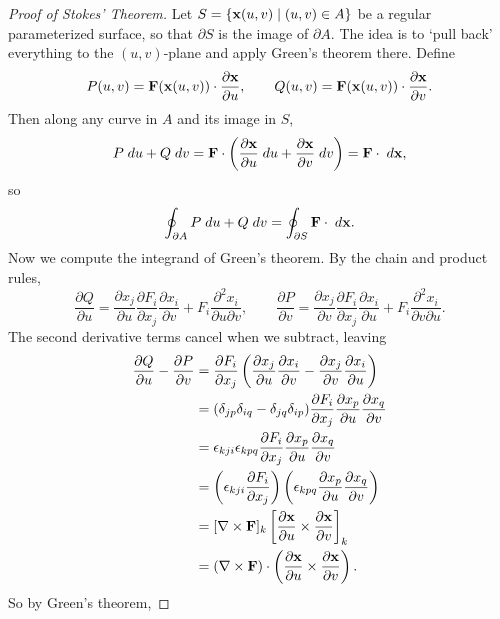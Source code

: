\documentclass[a4paper]{scrartcl}
\begin{document}
\begin{proof}[Proof of Stokes' Theorem]
	Let $S = \{\mathbf{x}(u, v) \mid (u, v) \in A\}$ be a regular parameterized surface, so that $\partial S$ is the image of $\partial A$. The idea is to `pull back' everything to the $(u, v)$-plane and apply Green's theorem there. Define
	$$
	P(u, v) = \mathbf{F}(\mathbf{x}(u, v)) \cdot \frac{\partial \mathbf{x}}{\partial u}, \quad \quad Q(u, v) = \mathbf{F}(\mathbf{x}(u, v)) \cdot \frac{\partial \mathbf{x}}{\partial v}.
	$$
	Then along any curve in $A$ and its image in $S$,
	$$
	P \; d u + Q \; d v = \mathbf{F} \cdot \left(\frac{\partial \mathbf{x}}{\partial u} \; d u + \frac{\partial \mathbf{x}}{\partial v} \; d v\right) = \mathbf{F} \cdot \; d \mathbf{x},
	$$
	so
	$$
	\oint_{\partial A} P \; d u + Q \; d v = \oint_{\partial S} \mathbf{F} \cdot \; d \mathbf{x}.
	$$
	Now we compute the integrand of Green's theorem. By the chain and product rules,
	$$
	\frac{\partial Q}{\partial u} = \frac{\partial x_j}{\partial u} \frac{\partial F_i}{\partial x_j} \frac{\partial x_i}{\partial v} + F_i \frac{\partial^2 x_i}{\partial u \partial v}, \quad \quad
	\frac{\partial P}{\partial v} = \frac{\partial x_j}{\partial v} \frac{\partial F_i}{\partial x_j} \frac{\partial x_i}{\partial u} + F_i \frac{\partial^2 x_i}{\partial v \partial u}.
	$$
	The second derivative terms cancel when we subtract, leaving
	\begin{align*}
		\frac{\partial Q}{\partial u} - \frac{\partial P}{\partial v} &= \frac{\partial F_i}{\partial x_j}\left(\frac{\partial x_j}{\partial u}\frac{\partial x_i}{\partial v} - \frac{\partial x_j}{\partial v} \frac{\partial x_i}{\partial u}\right) \\
		&= (\delta_{jp}\delta_{iq} - \delta_{jq}\delta_{ip}) \frac{\partial F_i}{\partial x_j} \frac{\partial x_p}{\partial u} \frac{\partial x_q}{\partial v} \\
		&= \epsilon_{kji}\epsilon_{kpq} \frac{\partial F_i}{\partial x_j} \frac{\partial x_p}{\partial u} \frac{\partial x_q}{\partial v} \\
		&= \left(\epsilon_{kji}\frac{\partial F_i}{\partial x_j}\right) \left(\epsilon_{kpq}\frac{\partial x_p}{\partial u} \frac{\partial x_q}{\partial v}\right) \\
		&= [\nabla \times \mathbf{F}]_k \left[\frac{\partial \mathbf{x}}{\partial u} \times \frac{\partial \mathbf{x}}{\partial v}\right]_k \\
		&= (\nabla \times \mathbf{F}) \cdot \left(\frac{\partial \mathbf{x}}{\partial u} \times \frac{\partial \mathbf{x}}{\partial v}\right).
	\end{align*}
	So by Green's theorem,

\end{proof}
\end{document}
